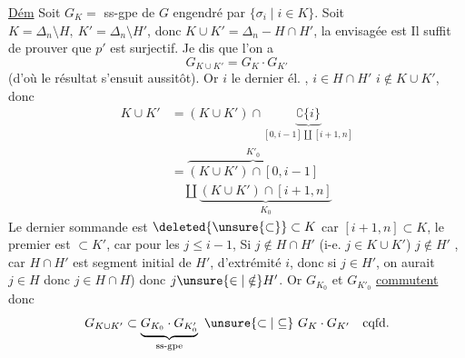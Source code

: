 \uline{Dém} Soit  $G_K=$ ss-gpe de $G$ engendré par $\{\sigma_i\mid i\in K\}$. Soit  $K=\Delta_n\setminus H,\ K'=\Delta_n\setminus H'$, donc $K\cup K'=\Delta_n-H\cap H'$, la   envisagée est
Il suffit de prouver que $p'$ est surjectif. Je dis que l'on a
\[
G_{K\cup K'}=G_K\cdot G_{K'}
\]
(d'où  le résultat s'ensuit aussitôt).
Or   $i$ le dernier él. ,   $i\in H\cap H'$  $i\notin K\cup K'$, donc
\[
\begin{aligned}
K\cup K'&=(K\cup K')\cap\underbrace{\complement\{i\}}_{[0,i-1]\amalg[i+1,n]}\\
&=\overbrace{(K\cup K')\cap[0,i-1]}^{K'_0}\\
&\quad\amalg\underbrace{(K\cup K')\cap[i+1,n]}_{K_0}
\end{aligned}
\]
Le dernier sommande est $\deleted{\unsure{\subset}}\subset K$ car $[i+1,n]\subset K$, le premier est $\subset K'$, car pour les $j\leq i-1$,
 Si $j\notin H\cap H'$ (i-e. $j\in K\cup K'$)   $j\notin H'$ , car $H\cap H'$ est segment initial de $H'$, d'extrémité $i$, donc si $j\in H'$, on aurait $j\in H$ donc $j\in H\cap H$) donc $j\unsure{\in|\notin}H'$.
 
Or $G_{K_0}$ et $G_{K'_0}$ \uline{commutent} donc
\[
G_{K\cup K'}\subset\underbrace{G_{K_0}\cdot G_{K'_0}}_{\text{ss-gpe}}\ \unsure{\subset|\subseteq}\ G_K\cdot G_{K'}\quad\text{cqfd.}
\]
